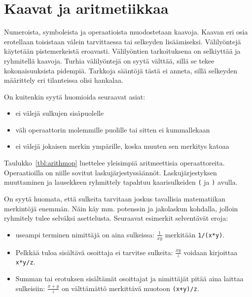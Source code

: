 \section{Kaavat ja aritmetiikkaa}
Numeroista, symboleista ja operaatioista muodostetaan kaavoja.
Kaavan eri osia erotellaan toisistaan välein tarvittaessa tai selkeyden lisäämiseksi.
Välilyöntejä käytetään pistemerkeistä eroavasti.
Välilyöntien tarkoituksena on selkiyttää ja ryhmitellä kaavoja.
Turhia välilyöntejä on syytä välttää, sillä se tekee kokonaisuuksista pidempiä.
Tarkkoja sääntöjä tästä ei anneta, sillä selkeyden määrittely eri tilanteissa olisi hankalaa.

On kuitenkin syytä huomioida seuraavat asiat:
\begin{itemize}
	\item ei välejä sulkujen sisäpuolelle
	\item väli operaattorin molemmille puolille tai sitten ei kummallekaan
	\item ei välejä jokaisen merkin ympärille, koska muuten sen merkitys katoaa
\end{itemize}

Taulukko~\ref{tbl:arithmop} luettelee yleisimpiä aritmeettisia operaattoreita.
Operaatioilla on niille sovitut laskujärjestyssäännöt.
Laskujärjestyksen muuttaminen ja lausekkeen ryhmittely tapahtuu kaarisulkeiden \verb$($ ja \verb$)$ avulla.

On syytä huomata, että sulkeita tarvitaan joskus tavallisia matematiikan merkintöjä enemmän.
Näin käy mm. potenssin ja jakolaskun kohdalla, jolloin ryhmitely tulee selväksi asettelusta. 
Seuraavat esimerkit selventävät eroja:
\begin{itemize}
	\item useampi terminen nimittäjä on aina sulkeissa: $\frac{1}{x y}$ merkitään \verb$1/(x*y)$.
	\item Pelkkää tuloa sisältävä osoittaja ei tarvitse sulkeita: $\frac{x y}{z}$ voidaan kirjoittaa \verb$x*y/z$.
	\item Summan tai erotuksen sisältämät osoittajat ja nimittäjät pitää aina laittaa sulkeisiin: $\frac{x+y}{z}$ on välttämättö merkittävä muotoon 
	\verb$(x+y)/z$.
\end{itemize}

